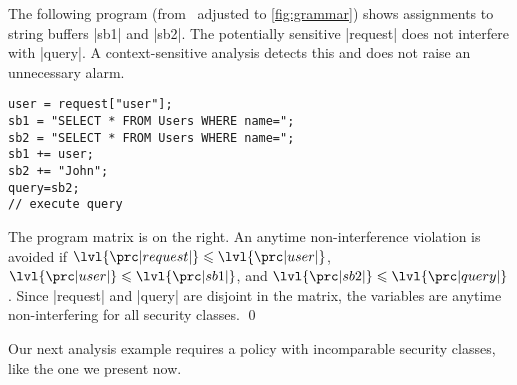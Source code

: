 \begin{example}\label{ex:sql}
The following program (from~\cite{huang2014} adjusted to \autoref{fig:grammar})
shows assignments to string buffers \prc|sb1| and \prc|sb2|.
The potentially sensitive \prc|request| does not interfere with \prc|query|.
A context-sensitive analysis detects this and does not raise an unnecessary alarm.

\noindent\begin{minipage}{.65\textwidth}
\begin{lstlisting}
user = request["user"];
sb1 = "SELECT * FROM Users WHERE name=";
sb2 = "SELECT * FROM Users WHERE name=";
sb1 += user;
sb2 += "John";
query=sb2;
// execute query
\end{lstlisting}
\end{minipage}\hfill{}

The program matrix is on the right.
An anytime non-interference violation is avoided if
\(\lvl{\prc|request|} \leqslant \lvl{\prc|user|}\),
\(\lvl{\prc|user|} \leqslant \lvl{\prc|sb1|}\), and
\(\lvl{\prc|sb2|} \leqslant \lvl{\prc|query|}\).
Since \prc|request| and \prc|query| are disjoint in the matrix, the variables are anytime non-interfering for all security classes.
\qed
\end{example}

Our next analysis example requires a policy with incomparable security classes, like the one we present now.

